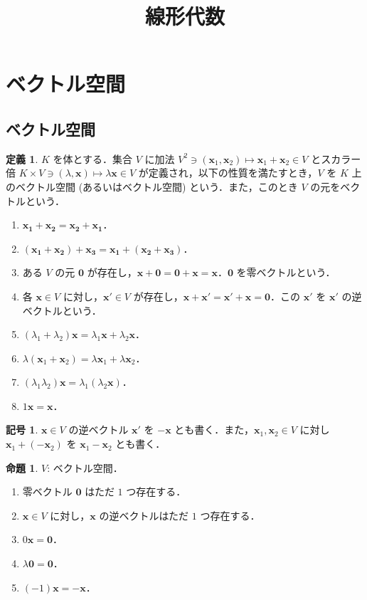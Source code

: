 \documentclass{jlreq}
\title{線形代数}
\author{}
\theoremstyle{definition}
\newtheorem{dfn}[thm]{定義}
\newtheorem{sym}[thm]{記号}
\newtheorem{prop}[thm]{命題}
\begin{document}
  \maketitle
  \tableofcontents
  \newpage
  \section{ベクトル空間}
    \subsection{ベクトル空間}
      \begin{dfn}
        $K$ を体とする．集合 $V$ に加法 $V^2 \ni (\bm{x}_1,\bm{x}_2) \mapsto \bm{x}_1+\bm{x}_2 \in V$ とスカラー倍 $K \times V \ni (\lambda,\bm{x}) \mapsto \lambda\bm{x} \in V$ が定義され，以下の性質を満たすとき，$V$ を $K$ 上のベクトル空間 (あるいはベクトル空間) という．また，このとき $V$ の元をベクトルという．
        \begin{enumerate}
          \item $\bm{x_1}+\bm{x_2}=\bm{x_2}+\bm{x_1}$．
          \item $(\bm{x_1}+\bm{x_2})+\bm{x_3}=\bm{x_1}+(\bm{x_2}+\bm{x_3})$．
          \item ある $V$ の元 $\bm{0}$ が存在し，$\bm{x}+\bm{0}=\bm{0}+\bm{x}=\bm{x}$．$\bm{0}$ を零ベクトルという．
          \item 各 $\bm{x} \in V$ に対し，$\bm{x}' \in V$ が存在し，$\bm{x}+\bm{x}'=\bm{x}'+\bm{x}=\bm{0}$．この $\bm{x}'$ を $\bm{x}'$ の逆ベクトルという．
          \item $(\lambda_1+\lambda_2)\bm{x}=\lambda_1\bm{x}+\lambda_2\bm{x}$．
          \item $\lambda(\bm{x}_1+\bm{x}_2)=\lambda\bm{x}_1+\lambda\bm{x}_2$．
          \item $(\lambda_1\lambda_2)\bm{x}=\lambda_1(\lambda_2\bm{x})$．
          \item $1\bm{x}=\bm{x}$．
        \end{enumerate}
      \end{dfn}
      \begin{sym}
        $\bm{x} \in V$ の逆ベクトル $\bm{x}'$ を $-\bm{x}$ とも書く．また，$\bm{x}_1,\bm{x}_2 \in V$ に対し $\bm{x}_1+(-\bm{x}_2)$ を $\bm{x}_1-\bm{x}_2$ とも書く．
      \end{sym}
      \begin{comment}
      \end{comment}
      \begin{prop}
        $V$: ベクトル空間．
        \begin{enumerate}
          \item 零ベクトル $\bm{0}$ はただ $1$ つ存在する．
          \item $\bm{x} \in V$ に対し，$\bm{x}$ の逆ベクトルはただ $1$ つ存在する．
          \item $0\bm{x}=\bm{0}$．
          \item $\lambda\bm{0}=\bm{0}$．
          \item $(-1)\bm{x}=-\bm{x}$．
        \end{enumerate}
      \end{prop}
\end{document}
